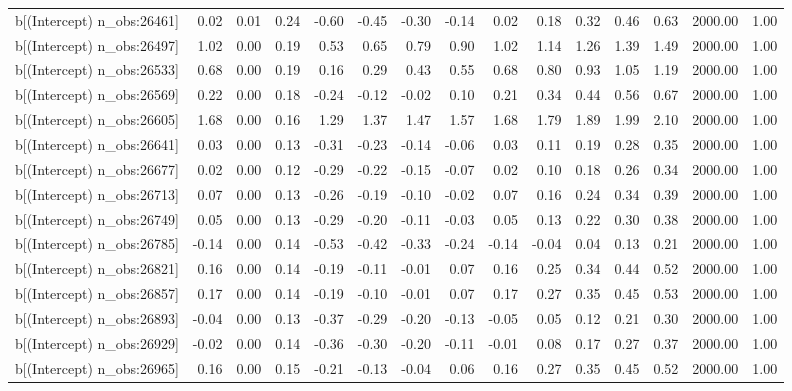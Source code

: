 \begin{table}[ht]
\begin{tabular}{rrrrrrrrrrrrrrr}
  b[(Intercept) n\_obs:26461] & 0.02 & 0.01 & 0.24 & -0.60 & -0.45 & -0.30 & -0.14 & 0.02 & 0.18 & 0.32 & 0.46 & 0.63 & 2000.00 & 1.00 \\ 
  b[(Intercept) n\_obs:26497] & 1.02 & 0.00 & 0.19 & 0.53 & 0.65 & 0.79 & 0.90 & 1.02 & 1.14 & 1.26 & 1.39 & 1.49 & 2000.00 & 1.00 \\ 
  b[(Intercept) n\_obs:26533] & 0.68 & 0.00 & 0.19 & 0.16 & 0.29 & 0.43 & 0.55 & 0.68 & 0.80 & 0.93 & 1.05 & 1.19 & 2000.00 & 1.00 \\ 
  b[(Intercept) n\_obs:26569] & 0.22 & 0.00 & 0.18 & -0.24 & -0.12 & -0.02 & 0.10 & 0.21 & 0.34 & 0.44 & 0.56 & 0.67 & 2000.00 & 1.00 \\ 
  b[(Intercept) n\_obs:26605] & 1.68 & 0.00 & 0.16 & 1.29 & 1.37 & 1.47 & 1.57 & 1.68 & 1.79 & 1.89 & 1.99 & 2.10 & 2000.00 & 1.00 \\ 
  b[(Intercept) n\_obs:26641] & 0.03 & 0.00 & 0.13 & -0.31 & -0.23 & -0.14 & -0.06 & 0.03 & 0.11 & 0.19 & 0.28 & 0.35 & 2000.00 & 1.00 \\ 
  b[(Intercept) n\_obs:26677] & 0.02 & 0.00 & 0.12 & -0.29 & -0.22 & -0.15 & -0.07 & 0.02 & 0.10 & 0.18 & 0.26 & 0.34 & 2000.00 & 1.00 \\ 
  b[(Intercept) n\_obs:26713] & 0.07 & 0.00 & 0.13 & -0.26 & -0.19 & -0.10 & -0.02 & 0.07 & 0.16 & 0.24 & 0.34 & 0.39 & 2000.00 & 1.00 \\ 
  b[(Intercept) n\_obs:26749] & 0.05 & 0.00 & 0.13 & -0.29 & -0.20 & -0.11 & -0.03 & 0.05 & 0.13 & 0.22 & 0.30 & 0.38 & 2000.00 & 1.00 \\ 
  b[(Intercept) n\_obs:26785] & -0.14 & 0.00 & 0.14 & -0.53 & -0.42 & -0.33 & -0.24 & -0.14 & -0.04 & 0.04 & 0.13 & 0.21 & 2000.00 & 1.00 \\ 
  b[(Intercept) n\_obs:26821] & 0.16 & 0.00 & 0.14 & -0.19 & -0.11 & -0.01 & 0.07 & 0.16 & 0.25 & 0.34 & 0.44 & 0.52 & 2000.00 & 1.00 \\ 
  b[(Intercept) n\_obs:26857] & 0.17 & 0.00 & 0.14 & -0.19 & -0.10 & -0.01 & 0.07 & 0.17 & 0.27 & 0.35 & 0.45 & 0.53 & 2000.00 & 1.00 \\ 
  b[(Intercept) n\_obs:26893] & -0.04 & 0.00 & 0.13 & -0.37 & -0.29 & -0.20 & -0.13 & -0.05 & 0.05 & 0.12 & 0.21 & 0.30 & 2000.00 & 1.00 \\ 
  b[(Intercept) n\_obs:26929] & -0.02 & 0.00 & 0.14 & -0.36 & -0.30 & -0.20 & -0.11 & -0.01 & 0.08 & 0.17 & 0.27 & 0.37 & 2000.00 & 1.00 \\ 
  b[(Intercept) n\_obs:26965] & 0.16 & 0.00 & 0.15 & -0.21 & -0.13 & -0.04 & 0.06 & 0.16 & 0.27 & 0.35 & 0.45 & 0.52 & 2000.00 & 1.00 \\ 

\end{tabular}
\end{table}
